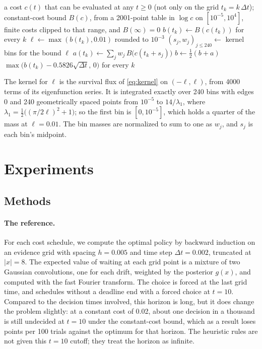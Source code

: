 \documentclass[11pt]{article}
\theoremstyle{definition}
\theoremstyle{remark}
\begin{document}
\begin{algorithm}[t]
  \caption{The weighted look-ahead rule as computed in the experiments.}
  \label{alg:weighted}
  \begin{algorithmic}[1]
    \Require a cost $c(t)$ that can be evaluated at any $t \ge 0$ (not only on the grid
      $t_k = k\,\Delta t$); constant-cost bound $B(c)$, from a 2001-point table in $\log c$ on
      $[10^{-5}, 10^{4}]$, finite costs clipped to that range, and $B(\infty) = 0$
    \State $b(t_k) \gets B(c(t_k))$ for every $k$ 
        \State $\ell \gets \max(b(t_k), 0.01)$ rounded to $10^{-3}$
        \State $(s_j, w_j)_{j \le 240} \gets$ kernel bins for the bound $\ell$ 
        \State $a(t_k) \gets \sum_j w_j\, B\bigl(c(t_k + s_j)\bigr)$
      \EndFor
      \State $b \gets \tfrac12 (b + a)$ 
    \EndFor
    \State \Return $\max\bigl(b(t_k) - 0.5826\sqrt{\Delta t},\, 0\bigr)$ for every $k$ 
  \end{algorithmic}
  \smallskip
  \footnotesize The kernel for $\ell$ is the survival flux of \eqref{eq:kernel} on $(-\ell, \ell)$,
  from 4000 terms of its eigenfunction series. It is integrated exactly over 240 bins with edges
  $0$ and 240 geometrically spaced points from $10^{-5}$ to $14/\lambda_1$, where
  $\lambda_1 = \tfrac12\bigl((\pi/2\ell)^2 + 1\bigr)$; so the first bin is $[0, 10^{-5}]$, which holds
  a quarter of the mass at $\ell = 0.01$. The bin masses are normalized to sum to one as $w_j$, and
  $s_j$ is each bin's midpoint.
\end{algorithm}

\section{Experiments}
\label{sec:experiments}

\subsection{Methods}
\label{sec:methods}

\paragraph{The reference.}
For each cost schedule, we compute the optimal policy by backward induction on an evidence grid
with spacing $h = 0.005$ and time step $\Delta t = 0.002$, truncated at $|x| = 8$. The expected
value of waiting at each grid point is a mixture of two Gaussian convolutions, one for each drift,
weighted by the posterior $g(x)$, and computed with the fast Fourier transform. The choice is
forced at the last grid time, and schedules without a deadline end with a forced choice at
$t = 10$. Compared to the decision times involved, this horizon is long, but it does change the
problem slightly: at a constant cost of 0.02, about one decision in a thousand is still undecided
at $t = 10$ under the constant-cost bound, which as a result loses \HorizonFloor{} points per 100
trials against the optimum for that horizon. The heuristic rules are not given this $t = 10$
cutoff; they treat the horizon as infinite.
\end{document}
